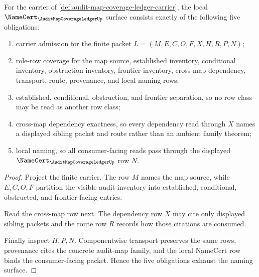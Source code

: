 \begin{theorem}
\label{thm:audit-map-coverage-ledger-namecert-obligations}
For the carrier of \autoref{def:audit-map-coverage-ledger-carrier}, the local $\NameCert_{\AuditMapCoverageLedgerUp}$ surface consists exactly of the following five obligations:
\begin{enumerate}
\item carrier admission for the finite packet $L=(M,E,C,O,F,X,H,R,P,N)$;
\item role-row coverage for the map source, established inventory, conditional inventory, obstruction inventory, frontier inventory, cross-map dependency, transport, route, provenance, and local naming rows;
\item established, conditional, obstruction, and frontier separation, so no row class may be read as another row class;
\item cross-map dependency exactness, so every dependency read through $X$ names a displayed sibling packet and route rather than an ambient family theorem;
\item local naming, so all consumer-facing reads pass through the displayed $\NameCert_{\AuditMapCoverageLedgerUp}$ row $N$.
\end{enumerate}
\end{theorem}
\begin{proof}
Project the finite carrier. The row $M$ names the map source, while $E,C,O,F$ partition the visible audit inventory into established, conditional, obstructed, and frontier-facing entries.

Read the cross-map row next. The dependency row $X$ may cite only displayed sibling packets and the route row $R$ records how those citations are consumed.

Finally inspect $H,P,N$. Componentwise transport preserves the same rows, provenance cites the concrete audit-map family, and the local NameCert row binds the consumer-facing packet. Hence the five obligations exhaust the naming surface.
\end{proof}

